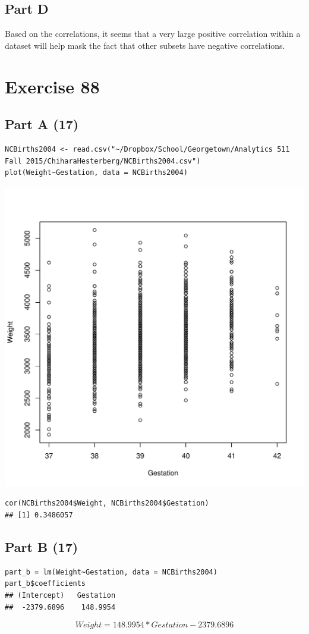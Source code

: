 \documentclass{article}\usepackage[]{graphicx}\usepackage[]{color}
\makeatletter
\newenvironment{kframe}{%
 \def\at@end@of@kframe{}%
 \ifinner\ifhmode%
  \def\at@end@of@kframe{\end{minipage}}%
  \begin{minipage}{\columnwidth}%
 \fi\fi%
 \def\FrameCommand##1{\hskip\@totalleftmargin \hskip-\fboxsep
 \colorbox{shadecolor}{##1}\hskip-\fboxsep
     \hskip-\linewidth \hskip-\@totalleftmargin \hskip\columnwidth}%
 \MakeFramed {\advance\hsize-\width
   \@totalleftmargin\z@ \linewidth\hsize
   \@setminipage}}%
 {\par\unskip\endMakeFramed%
 \at@end@of@kframe}
\newenvironment{knitrout}{}{} %
\makeatother
\begin{document}
\subsection*{Part D}
Based on the correlations, it seems that a very large positive correlation within a dataset will help mask the fact that other subsets have negative correlations. 
\section*{Exercise 88}
\subsection*{Part A (17)}
\begin{knitrout}
\color{fgcolor}\begin{kframe}
\begin{verbatim}
NCBirths2004 <- read.csv("~/Dropbox/School/Georgetown/Analytics 511 Fall 2015/ChiharaHesterberg/NCBirths2004.csv")
plot(Weight~Gestation, data = NCBirths2004)
\end{verbatim}
\end{kframe}
\includegraphics[width=0.33\linewidth]{figure/unnamed-chunk-19-1} 
\begin{kframe}\begin{verbatim}
cor(NCBirths2004$Weight, NCBirths2004$Gestation)
## [1] 0.3486057
\end{verbatim}
\end{kframe}
\end{knitrout}
\subsection*{Part B (17)}
\begin{knitrout}
\color{fgcolor}\begin{kframe}
\begin{verbatim}
part_b = lm(Weight~Gestation, data = NCBirths2004)
part_b$coefficients
## (Intercept)   Gestation 
##  -2379.6896    148.9954
\end{verbatim}
\end{kframe}
\end{knitrout}
\begin{equation}
Weight = 148.9954*Gestation - 2379.6896
\end{equation}
\end{document}
